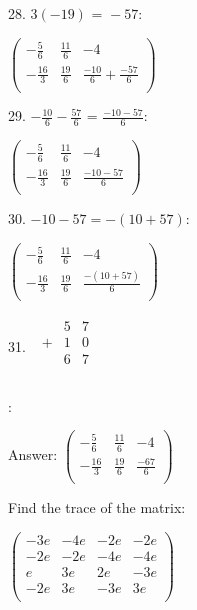 \documentclass{article}
\begin{document}
28. $3 (-19)\text{ = }-57:$

$\left(
\begin{array}{ccc}
-\frac{5}{6} & \frac{11}{6} & -4 \\
 -\frac{16}{3} & \frac{19}{6} & \frac{-10}{6}+\frac{-57}{6} \\
\end{array}
\right)$

29. $-\frac{10}{6}-\frac{57}{6}\text{ = }\frac{-10-57}{6}$:

$\left(
\begin{array}{ccc}
-\frac{5}{6} & \frac{11}{6} & -4 \\
 -\frac{16}{3} & \frac{19}{6} & \frac{-10-57}{6} \\
\end{array}
\right)$

30. $-10-57=-(10+57):$

$\left(
\begin{array}{ccc}
-\frac{5}{6} & \frac{11}{6} & -4 \\
 -\frac{16}{3} & \frac{19}{6} & \frac{-(10+57)}{6} \\
\end{array}
\right)$

31. $\begin{array}{c}
\begin{array}{ccc}
\hline
\text{  }& 5 & 7 \\
\hline
 + & 1 & 0 \\
\text{  }& 6 & 7 \\
\end{array}
 \\
\end{array}$

:

Answer: $\left(
\begin{array}{ccc}
-\frac{5}{6} & \frac{11}{6} & -4 \\
 -\frac{16}{3} & \frac{19}{6} & \frac{-67}{6} \\
\end{array}
\right)$

\pagebreak

Find the trace of the matrix:

$\left(
\begin{array}{cccc}
-3 e & -4 e & -2 e & -2 e \\
 -2 e & -2 e & -4 e & -4 e \\
 e & 3 e & 2 e & -3 e \\
 -2 e & 3 e & -3 e & 3 e \\
\end{array}
\right)$
\end{document}
